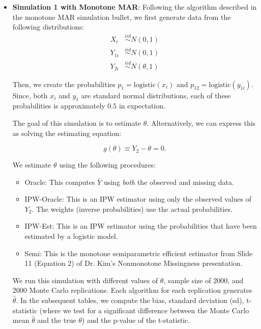 \documentclass[12pt]{article}
\newcommand{\logistic}{{\text{logistic}}}
\begin{document}
\begin{itemize}
  \item \textbf{Simulation 1 with Monotone MAR}:
    Following the algorithm described in the monotone MAR simulation bullet, 
    we first generate data from the following distributions:
    \begin{align*}
        X_i &\stackrel{iid}{\sim} N(0, 1) \\
        Y_{1i} &\stackrel{iid}{\sim} N(0, 1)\\
        Y_{2i} &\stackrel{iid}{\sim} N(\theta, 1)
    \end{align*}

    Then, we create the probabilities $p_1 = \logistic(x_i)$ and 
    $p_{12} = \logistic(y_{1i})$.
    Since, both $x_i$ and $y_1$ are standard normal distributions, each of these
    probabilities is approximately $0.5$ in expectation.

    The goal of this simulation is to estimate $\theta$. Alternatively, we can
    express this as solving the estimating equation:

    \[g(\theta) \equiv Y_2 - \theta = 0.\]

    We estimate $\theta$ using the following procedures:

    \begin{itemize}
        \item Oracle: This computes $\bar Y$ using \textit{both} the observed
          and missing data.
        \item IPW-Oracle: This is an IPW estimator using only the observed
          values of $Y_2$. The weights (inverse probabilities) use the actual
          probabilities.
        \item IPW-Est: This is an IPW estimator using the probabilities that
          have been estimated by a logistic model.
        \item Semi: This is the monotone semiparametric efficient estimator from
          Slide 11 (Equation 2) of Dr. Kim's Nonmonotone Missingness
          presentation.
    \end{itemize}

    We run this simulation with different values of $\theta$, sample size of
    2000, and 2000 Monte Carlo replications. Each algorithm for each replication
    generates $\hat \theta$. In the subsequent tables, we compute the bias,
    standard deviation (sd), t-statistic (where we test for a significant
    difference between the Monte Carlo mean $\hat \theta$ and the true $\theta$)
    and the p-value of the t-statistic.
    

\end{itemize}
\end{document}
